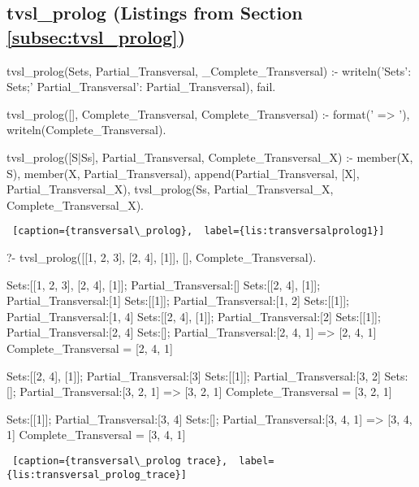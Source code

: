 \subsection{tvsl\_prolog (Listings from Section \ref{subsec:tvsl_prolog})} \label{appsubsec:tvsl_prolog}

\begin{minipage}{\linewidth} \largev
\begin{python}[numbers=left]
tvsl_prolog(Sets, Partial_Transversal, _Complete_Transversal) :-
    writeln('Sets': Sets;'  Partial_Transversal': Partial_Transversal), 
    fail.

tvsl_prolog([], Complete_Transversal, Complete_Transversal) :-
    format(' => '),
    writeln(Complete_Transversal).

tvsl_prolog([S|Ss], Partial_Transversal, Complete_Transversal_X) :-
    member(X, S),
    \+ member(X, Partial_Transversal),
    append(Partial_Transversal, [X], Partial_Transversal_X),
    tvsl_prolog(Ss, Partial_Transversal_X, Complete_Transversal_X).

\end{python}
\begin{lstlisting} [caption={transversal\_prolog},  label={lis:transversalprolog1}]
\end{lstlisting}
\end{minipage}


\noindent
\begin{minipage}{\linewidth} \largev 
\begin{python}
?- tvsl_prolog([[1, 2, 3], [2, 4], [1]], [], Complete_Transversal).

Sets:[[1, 2, 3], [2, 4], [1]]; Partial_Transversal:[]
Sets:[[2, 4], [1]]; Partial_Transversal:[1]
Sets:[[1]]; Partial_Transversal:[1, 2]
Sets:[[1]]; Partial_Transversal:[1, 4]
Sets:[[2, 4], [1]]; Partial_Transversal:[2]
Sets:[[1]]; Partial_Transversal:[2, 4]
Sets:[]; Partial_Transversal:[2, 4, 1]
 => [2, 4, 1]
 Complete_Transversal = [2, 4, 1]

Sets:[[2, 4], [1]]; Partial_Transversal:[3]
Sets:[[1]]; Partial_Transversal:[3, 2]
Sets:[]; Partial_Transversal:[3, 2, 1]
 => [3, 2, 1]
 Complete_Transversal = [3, 2, 1]

Sets:[[1]]; Partial_Transversal:[3, 4]
Sets:[]; Partial_Transversal:[3, 4, 1]
 => [3, 4, 1]
 Complete_Transversal = [3, 4, 1]
\end{python}
\begin{lstlisting} [caption={transversal\_prolog trace},  label={lis:transversal_prolog_trace}]
\end{lstlisting}
\end{minipage}


